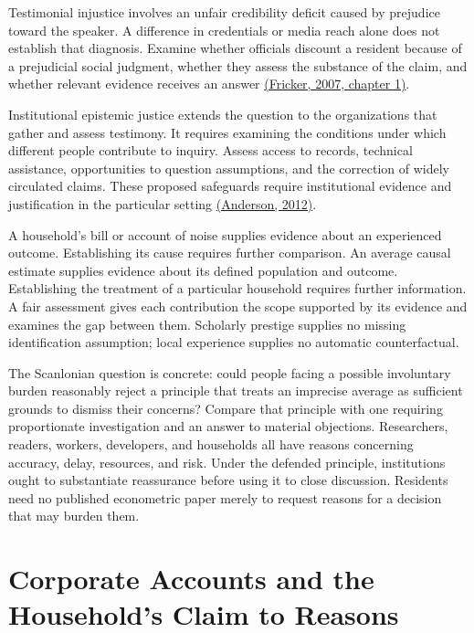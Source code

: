 Testimonial injustice involves an unfair credibility deficit caused by
prejudice toward the speaker. A difference in credentials or media reach
alone does not establish that diagnosis. Examine whether officials
discount a resident because of a prejudicial social judgment, whether
they assess the substance of the claim, and whether relevant evidence
receives an answer
\href{https://academic.oup.com/book/32817/chapter-abstract/274999720}{(Fricker,
2007, chapter 1)}.

Institutional epistemic justice extends the question to the
organizations that gather and assess testimony. It requires examining
the conditions under which different people contribute to inquiry.
Assess access to records, technical assistance, opportunities to
question assumptions, and the correction of widely circulated claims.
These proposed safeguards require institutional evidence and
justification in the particular setting
\href{https://websites.umich.edu/eandersn/abstracts.htm}{(Anderson,
2012)}.

A household's bill or account of noise supplies evidence about an
experienced outcome. Establishing its cause requires further comparison.
An average causal estimate supplies evidence about its defined
population and outcome. Establishing the treatment of a particular
household requires further information. A fair assessment gives each
contribution the scope supported by its evidence and examines the gap
between them. Scholarly prestige supplies no missing identification
assumption; local experience supplies no automatic counterfactual.

The Scanlonian question is concrete: could people facing a possible
involuntary burden reasonably reject a principle that treats an
imprecise average as sufficient grounds to dismiss their concerns?
Compare that principle with one requiring proportionate investigation
and an answer to material objections. Researchers, readers, workers,
developers, and households all have reasons concerning accuracy, delay,
resources, and risk. Under the defended principle, institutions ought to
substantiate reassurance before using it to close discussion. Residents
need no published econometric paper merely to request reasons for a
decision that may burden them.


\hypertarget{M09-corporate-accounts-and-the-households-claim-to-reasons}{%
\section{Corporate Accounts and the Household's Claim to
Reasons}\label{M09-corporate-accounts-and-the-households-claim-to-reasons}}

